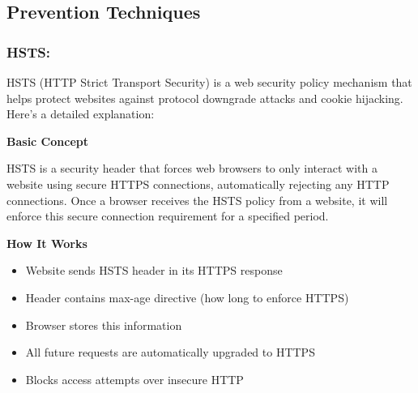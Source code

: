 %
\subsection{Prevention Techniques}
\subsubsection{HSTS:}
HSTS (HTTP Strict Transport Security) is a web security policy mechanism that helps protect websites against protocol downgrade attacks and cookie hijacking. Here's a detailed explanation:

\textbf{Basic Concept}

HSTS is a security header that forces web browsers to only interact with a website using secure HTTPS connections, automatically rejecting any HTTP connections. Once a browser receives the HSTS policy from a website, it will enforce this secure connection requirement for a specified period.

\textbf{How It Works}
\begin{itemize}
    \item Website sends HSTS header in its HTTPS response
    \item Header contains max-age directive (how long to enforce HTTPS)
    \item Browser stores this information
    \item All future requests are automatically upgraded to HTTPS
    \item Blocks access attempts over insecure HTTP
\end{itemize}

